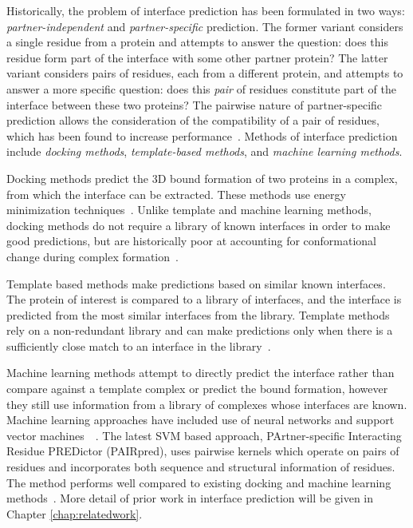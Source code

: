 Historically, the problem of interface prediction has been formulated in two ways: \emph{partner-independent} and \emph{partner-specific} prediction.
The former variant considers a single residue from a protein and attempts to answer the question: does this residue form part of the interface with some other partner protein?
The latter variant considers pairs of residues, each from a different protein, and attempts to answer a more specific question: does this \emph{pair} of residues constitute part of the interface between these two proteins?
The pairwise nature of partner-specific prediction allows the consideration of the compatibility of a pair of residues, which has been found to increase performance~\cite{ahmad2011, minhas2014}.
Methods of interface prediction include \emph{docking methods}, \emph{template-based methods}, and \emph{machine learning methods}.

Docking methods predict the 3D bound formation of two proteins in a complex, from which the interface can be extracted. 
These methods use energy minimization techniques~\cite{chen2003, zundert2016}.
Unlike template and machine learning methods, docking methods do not require a library of known interfaces in order to make good predictions, but are historically poor at accounting for conformational change during complex formation~\cite{ezkurdia2009}.

Template based methods make predictions based on similar known interfaces.
The protein of interest is compared to a library of interfaces, and the interface is predicted from the most similar interfaces from the library.
Template methods rely on a non-redundant library and can make predictions only when there is a sufficiently close match to an interface in the library~\cite{tuncbag2011}.

Machine learning methods attempt to directly predict the interface rather than compare against a template complex or predict the bound formation, however they still use information from a library of complexes whose interfaces are known.
Machine learning approaches have included use of neural networks and support vector machines~\cite{ahmad2011}~\cite{minhas2014}.
The latest SVM based approach, PArtner-specific Interacting Residue PREDictor (PAIRpred), uses pairwise kernels which operate on pairs of residues and incorporates both sequence and structural information of residues.
The method performs well compared to existing docking and machine learning methods~\cite{minhas2014}. More detail of prior work in interface prediction will be given in Chapter \ref{chap:relatedwork}.